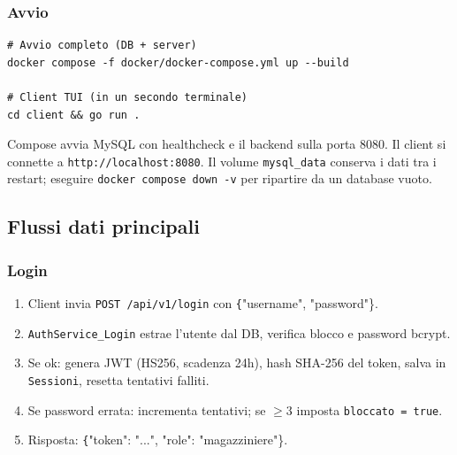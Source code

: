 \documentclass[a4paper,12pt]{article}
\begin{document}
\subsubsection{Avvio}

\begin{verbatim}
# Avvio completo (DB + server)
docker compose -f docker/docker-compose.yml up --build

# Client TUI (in un secondo terminale)
cd client && go run .
\end{verbatim}

Compose avvia MySQL con healthcheck e il backend sulla porta 8080. Il client si connette a \texttt{http://localhost:8080}. Il volume \texttt{mysql\_data} conserva i dati tra i restart; eseguire \texttt{docker compose down -v} per ripartire da un database vuoto.

\subsection{Flussi dati principali}

\subsubsection{Login}
\begin{enumerate}
    \item Client invia \texttt{POST /api/v1/login} con \texttt\{"username", "password"\}.
    \item \texttt{AuthService\_Login} estrae l'utente dal DB, verifica blocco e password bcrypt.
    \item Se ok: genera JWT (HS256, scadenza 24h), hash SHA-256 del token, salva in \texttt{Sessioni}, resetta tentativi falliti.
    \item Se password errata: incrementa tentativi; se $\geq 3$ imposta \texttt{bloccato = true}.
    \item Risposta: \texttt\{"token": "...", "role": "magazziniere"\}.
\end{enumerate}
\end{document}
